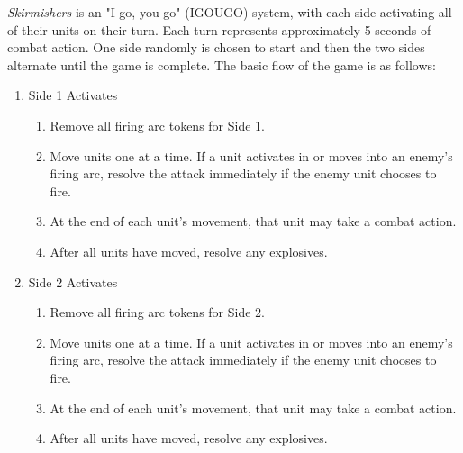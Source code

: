 \emph{Skirmishers} is an "I go, you go" (IGOUGO) system, with each side activating all of their units on their turn.
Each turn represents approximately 5 seconds of combat action.
One side randomly is chosen to start and then the two sides alternate until the game is complete.
The basic flow of the game is as follows:

\begin{enumerate}

  \item Side 1 Activates

  \begin{enumerate}

    \item Remove all firing arc tokens for Side 1.

    \item Move units one at a time.
       If a unit activates in or moves into an enemy's firing arc, resolve the attack immediately if the enemy unit chooses to fire.

    \item At the end of each unit's movement, that unit may take a combat action.

    \item After all units have moved, resolve any explosives.

  \end{enumerate}

  \item Side 2 Activates

  \begin{enumerate}

    \item Remove all firing arc tokens for Side 2.

    \item Move units one at a time.
       If a unit activates in or moves into an enemy's firing arc, resolve the attack immediately if the enemy unit chooses to fire.

    \item At the end of each unit's movement, that unit may take a combat action.

    \item After all units have moved, resolve any explosives.

  \end{enumerate}

\end{enumerate}
